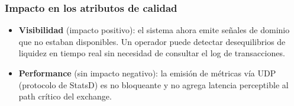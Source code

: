 \subsubsection{Impacto en los atributos de calidad}

\begin{itemize}[leftmargin=*]
    \item \textbf{Visibilidad} (impacto positivo): el sistema ahora emite señales de dominio que no estaban disponibles. Un operador puede detectar desequilibrios de liquidez en tiempo real sin necesidad de consultar el log de transacciones.
    \item \textbf{Performance} (sin impacto negativo): la emisión de métricas vía UDP (protocolo de StatsD) es no bloqueante y no agrega latencia perceptible al path crítico del exchange.
\end{itemize}